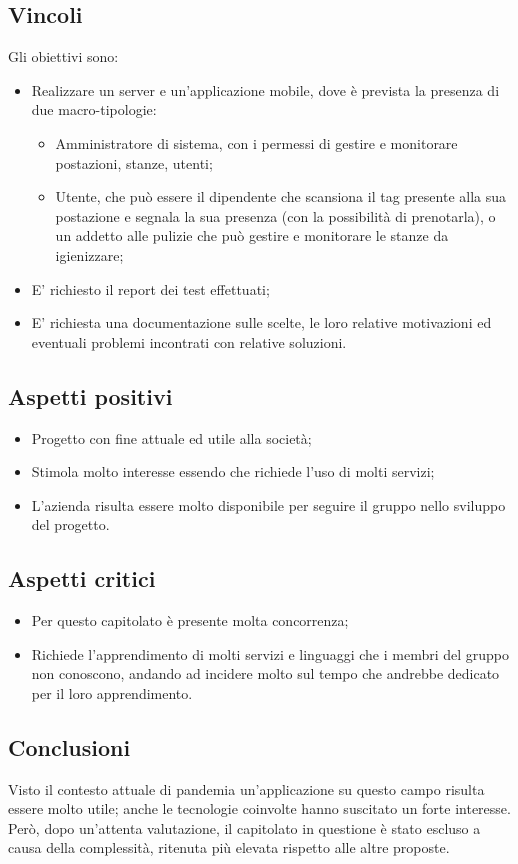 \subsection{Vincoli}
Gli obiettivi sono:
\begin{itemize}
\item	Realizzare un server e un'applicazione mobile, dove è prevista la presenza di due macro-tipologie:
\begin{itemize}
\item	Amministratore di sistema, con i permessi di gestire e monitorare postazioni, stanze, utenti;
\item	Utente, che può essere il dipendente che scansiona il tag presente alla sua postazione e segnala la sua presenza (con la possibilità di prenotarla), o un addetto alle pulizie che può gestire e monitorare le stanze da igienizzare;
\end{itemize}
\item	E' richiesto il report dei test effettuati;
\item	E' richiesta una documentazione sulle scelte, le loro relative motivazioni ed eventuali problemi incontrati con relative soluzioni.
\end{itemize}

\subsection{Aspetti positivi}
\begin{itemize}
\item	Progetto con fine attuale ed utile alla società;
\item	Stimola molto interesse essendo che richiede l'uso di molti servizi;
\item	L'azienda risulta essere molto disponibile per seguire il gruppo nello sviluppo del progetto.
\end{itemize}
\subsection{Aspetti critici}
\begin{itemize}
\item	Per questo capitolato è presente molta concorrenza;
\item	Richiede l'apprendimento di molti servizi e linguaggi che i membri del gruppo non conoscono, andando ad incidere molto sul tempo che andrebbe dedicato per il loro apprendimento.
\end{itemize}

\subsection{Conclusioni}
Visto il contesto attuale di pandemia un'applicazione su questo campo risulta essere molto utile; anche le tecnologie coinvolte hanno suscitato un forte interesse. Però, dopo un'attenta valutazione, il capitolato in questione è stato escluso a causa della complessità, ritenuta più elevata rispetto alle altre proposte. 
